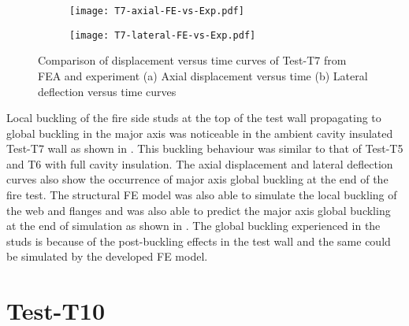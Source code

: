 \begin{figure}[!htbp]
	\centering
	\begin{subfigure}[b]{0.7\textwidth}
		\centering
		\texttt{[image: T7-axial-FE-vs-Exp.pdf]}
		\caption{}
		\label{subfig:T7-axial-FE-vs-Exp}
	\end{subfigure}
	\begin{subfigure}[b]{0.7\textwidth}
		\centering
		\texttt{[image: T7-lateral-FE-vs-Exp.pdf]}
		\caption{}
		\label{subfig:T7-lateral-FE-vs-Exp}
	\end{subfigure}
	   \caption{Comparison of displacement versus time curves of Test-T7 from FEA and experiment (a) Axial displacement versus time (b) Lateral deflection versus time curves}
	   \label{fig:T7-structural-FE-vs-Exp}
\end{figure} 

Local buckling of the fire side studs at the top of the test wall propagating to global buckling in the major axis was noticeable in the ambient cavity insulated Test-T7 wall as shown in . This buckling behaviour was similar to that of Test-T5 and T6 with full cavity insulation.  The axial displacement and lateral deflection curves also show the occurrence of major axis global buckling at the end of the fire test. The structural FE model was also able to simulate the local buckling of the web and flanges and was also able to predict the major axis global buckling at the end of simulation as shown in . The global buckling experienced in the studs is because of the post-buckling effects in the test wall and the same could be simulated by the developed FE model.

\section*{Test-T10}

